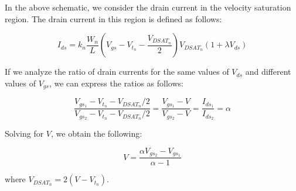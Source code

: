 \documentclass[fleqn]{article}
\begin{document}
	 \noindent In the above schematic, we consider the drain current in the velocity saturation region. The drain current in this region is defined as follows:
	
	\begin{equation}
		I_{ds} = k_n\frac{W_n}{L}\left(V_{gs} - V_{t_n} - \frac{V_{DSAT_n}}{2}\right)V_{DSAT_n}(1 + {\lambda}V_{ds})
	\end{equation}
	
	\noindent If we analyze the ratio of drain currents for the same values of $V_{ds}$ and different values of $V_{gs}$, we can express the ratios as follows:
	
	\begin{equation}
		\frac{V_{gs_1} - V_{t_n} - V_{DSAT_n}/2}{V_{gs_2} - V_{t_n} - V_{DSAT_n}/2} = \frac{V_{gs_1} - V}{V_{gs_2} - V} = \frac{I_{ds_1}}{I_{ds_2}} = \alpha
	\end{equation}
	
	\noindent Solving for $V$, we obtain the following:
	
	\begin{equation}
		V = \frac{{\alpha}V_{gs_2} - V_{gs_1}}{\alpha - 1}
	\end{equation}
	
	\noindent where $V_{DSAT_n} = 2(V - V_{t_n})$.
	
\end{document}
